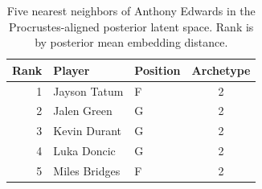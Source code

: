 \begin{table}[htbp]
  \centering\small
  \begin{tabular}{rllc}
    \toprule
    Rank & Player & Position & Archetype \\
    \midrule
    1 & Jayson Tatum & F & 2 \\
    2 & Jalen Green & G & 2 \\
    3 & Kevin Durant & G & 2 \\
    4 & Luka Doncic & G & 2 \\
    5 & Miles Bridges & F & 2 \\
    \bottomrule
  \end{tabular}
  \caption{Five nearest neighbors of Anthony Edwards in the Procrustes-aligned posterior latent space. Rank is by posterior mean embedding distance.}
  \label{tab:Anthony_Edwards_neighbors}
\end{table}

